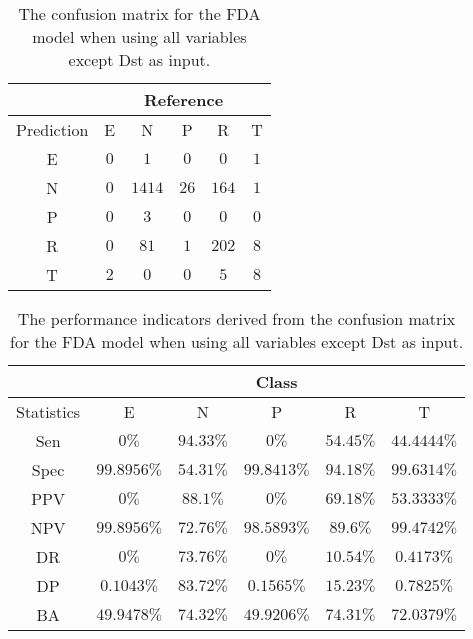 \begin{table}[!ht]
	\centering
	\begin{tabular}{|c|c|c|c|c|c|}
		\hline
		 & \multicolumn{5}{|c|}{Reference} \\ \hline
		 Prediction & E & N & P & R & T \\ \hline
		 E & $0$ & $1$ & $0$ & $0$ & $1$ \\ \hline
		 N & $0$ & $1414$ & $26$ & $164$ & $1$ \\ \hline
		 P & $0$ & $3$ & $0$ & $0$ & $0$ \\ \hline
		 R & $0$ & $81$ & $1$ & $202$ & $8$ \\ \hline
		 T & $2$ & $0$ & $0$ & $5$ & $8$ \\ \hline
	\end{tabular}
	\caption{The confusion matrix for the FDA model when using all variables except Dst as input.}
	\label{tab:cm:noDst:fda}
\end{table}

\begin{table}[!ht]
	\centering
	\begin{tabular}{|c|c|c|c|c|c|}
		\hline
		 & \multicolumn{5}{c|}{Class} \\ \hline
		Statistics & E & N & P & R & T \\ \hline
		Sen & $0\%$ & $94.33\%$ & $0\%$ & $54.45\%$ & $44.4444\%$ \\ \hline
		Spec & $99.8956\%$ & $54.31\%$ & $99.8413\%$ & $94.18\%$ & $99.6314\%$ \\ \hline
		PPV & $0\%$ & $88.1\%$ & $0\%$ & $69.18\%$ & $53.3333\%$ \\ \hline
		NPV & $99.8956\%$ & $72.76\%$ & $98.5893\%$ & $89.6\%$ & $99.4742\%$ \\ \hline
		DR & $0\%$ & $73.76\%$ & $0\%$ & $10.54\%$ & $0.4173\%$ \\ \hline
		DP & $0.1043\%$ & $83.72\%$ & $0.1565\%$ & $15.23\%$ & $0.7825\%$ \\ \hline
		BA & $49.9478\%$ & $74.32\%$ & $49.9206\%$ & $74.31\%$ & $72.0379\%$ \\ \hline
	\end{tabular}
	\caption{The performance indicators derived from the confusion matrix for the FDA model when using all variables except Dst as input.}
	\label{tab:cs:reverse:noDst:fda}
\end{table}
